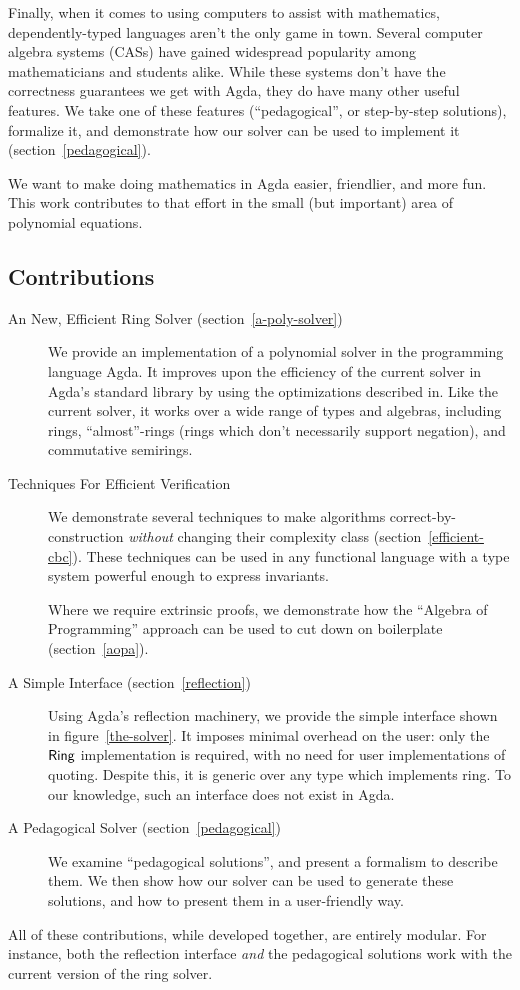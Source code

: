 \documentclass[draft, twocolumn]{article}
\theoremstyle{definition}
\theoremstyle{definition}
\begin{document}
Finally, when it comes to using computers to assist with mathematics,
dependently-typed languages aren't the only game in town. Several computer
algebra systems (CASs) have gained widespread popularity among mathematicians
and students alike. While these systems don't have the correctness guarantees we
get with Agda, they do have many other useful features. We take one of these
features (``pedagogical'', or step-by-step solutions), formalize it, and
demonstrate how our solver can be used to implement it
(section~\ref{pedagogical}).

We want to make doing mathematics in Agda easier, friendlier, and more fun. This
work contributes to that effort in the small (but important) area of polynomial
equations.
\subsection{Contributions}
\begin{description}
  \item[An New, Efficient Ring Solver (section~\ref{a-poly-solver})] We provide
    an implementation of a polynomial solver in the programming
    language Agda. It improves upon the efficiency of the current solver in
    Agda's standard library\cite{danielsson_agda_2018} by using the
    optimizations described in\cite{gregoire_proving_2005}. Like the current
    solver, it works over a wide range of types and algebras, including rings,
    ``almost''-rings (rings which don't necessarily support negation), and
    commutative semirings.
  \item[Techniques For Efficient Verification] We demonstrate several techniques
    to make algorithms correct-by-construction \emph{without} changing their
    complexity class (section~\ref{efficient-cbc}). These techniques can be used
    in any functional language with a type system powerful enough to express
    invariants.

    Where we require extrinsic proofs, we demonstrate how the ``Algebra of
    Programming'' approach\cite{mu_algebra_2009} can be used to cut down on
    boilerplate (section~\ref{aopa}).
  \item[A Simple Interface (section~\ref{reflection})] Using
    Agda's reflection machinery, we provide the simple interface shown in
    figure~\ref{the-solver}. It imposes minimal overhead on the user: only the
    \(\AgdaDatatype{Ring}\) implementation is required, with no need for user
    implementations of quoting. Despite this, it is generic over any type which
    implements ring. To our knowledge, such an interface does not exist in Agda.
  \item[A Pedagogical Solver (section~\ref{pedagogical})] We examine
    ``pedagogical solutions'', and present a formalism to describe them. We then
    show how our solver can be used to generate these solutions, and how to
    present them in a user-friendly way.
\end{description}
All of these contributions, while developed together, are entirely modular. For
instance, both the reflection interface \emph{and} the pedagogical solutions
work with the current version of the ring solver.
\end{document}
